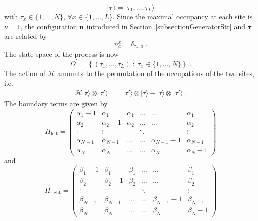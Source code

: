 \documentclass[10pt]{article}
\numberwithin{equation}{section}
\numberwithin{equation}{subsection}
\newcommand{\dt}{\;.}
\begin{document}
\begin{equation}\label{Tau-Notation}
	|\bm{\tau}\rangle=|\tau_{1},\ldots,\tau_{L}\rangle
\end{equation} 
with $\tau_{x}\in \{1,\ldots,N\}$, $\forall x\in \{1,\ldots,L\}$. Since the maximal occupancy at each site is $\nu=1$,  the configuration $\bm{n}$ introduced in Section~\ref{subsectionGeneratorStr} and $\bm{\tau}$ are related by 
\begin{equation}\label{notation-change-relation}
	n_{a}^{x}=\delta_{\tau_{x},a}\dt
\end{equation}
The state space of the process is now 
\begin{equation}
	\Omega^{'}=\left\{(\tau_{1},\ldots,\tau_{L})\;:\; \tau_{x}\in\{1,\ldots,N\}\right\}\dt
\end{equation}
The action of $\mathcal{H}$ amounts to the permutation of the occupations of the two sites, i.e.
\begin{equation}
	\begin{split}
		\mathcal{H}| \tau\rangle\otimes   |\tau'\rangle&=|\tau'\rangle \otimes |\tau\rangle-|\tau\rangle \otimes|\tau'\rangle\dt
	\end{split}
\end{equation}
The boundary terms are given by 
\begin{equation}
	H_{\text{left}}=\begin{pmatrix}
		\alpha_{1}-1&\alpha_{1}&\alpha_{1}&\ldots&\ldots&\alpha_{1}\\
		\alpha_{2}&\alpha_{2}-1&\alpha_{2}&\ldots&\ldots&\alpha_{2}\\
		\vdots&\vdots& &\ddots& &\vdots\\
		\alpha_{N-1}&\alpha_{N-1}&\ldots&\ldots&\alpha_{N-1}-1&\alpha_{N-1}\\
		\alpha_{N}&\alpha_{N}&\ldots&\ldots&\alpha_{N}&\alpha_{N}-1
	\end{pmatrix}
\end{equation}
and 
\begin{equation}
	H_{\text{right}}=\begin{pmatrix}
		\beta_{1}-1&\beta_{1}&\beta_{1}&\ldots&\ldots&\beta_{1}\\
		\beta_{2}&\beta_{2}-1&\beta_{2}&\ldots&\ldots&\beta_{2}\\
		\vdots&\vdots& &\ddots& &\vdots\\
		\beta_{N-1}&\beta_{N-1}&\ldots&\ldots&\beta_{N-1}-1&\beta_{N-1}\\
		\beta_{N}&\beta_{N}&\ldots&\ldots&\beta_{N}&\beta_{N}-1
	\end{pmatrix}
\end{equation}
\end{document}
